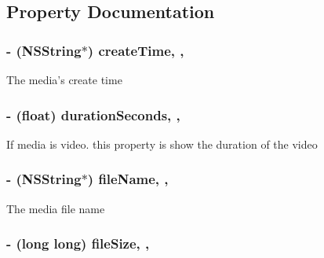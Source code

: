 \subsection{Property Documentation}
\hypertarget{interface_d_j_i_media_a5fca68c2fabc5e5f2b10ca028ad68954}{
\subsubsection[{create\+Time}]{\setlength{\rightskip}{0pt plus 5cm}-\/ (N\+S\+String$\ast$) create\+Time\hspace{0.3cm}{\ttfamily [read]}, {\ttfamily [nonatomic]}, {\ttfamily [assign]}}}\label{interface_d_j_i_media_a5fca68c2fabc5e5f2b10ca028ad68954}
The media's create time \hypertarget{interface_d_j_i_media_a530c5cebcd1ffa67e1b32e73946f3961}{
\subsubsection[{duration\+Seconds}]{\setlength{\rightskip}{0pt plus 5cm}-\/ (float) duration\+Seconds\hspace{0.3cm}{\ttfamily [read]}, {\ttfamily [nonatomic]}, {\ttfamily [assign]}}}\label{interface_d_j_i_media_a530c5cebcd1ffa67e1b32e73946f3961}
If media is video. this property is show the duration of the video \hypertarget{interface_d_j_i_media_ad57506b4b8d11c702f55ce934b243fd4}{
\subsubsection[{file\+Name}]{\setlength{\rightskip}{0pt plus 5cm}-\/ (N\+S\+String$\ast$) file\+Name\hspace{0.3cm}{\ttfamily [read]}, {\ttfamily [nonatomic]}, {\ttfamily [assign]}}}\label{interface_d_j_i_media_ad57506b4b8d11c702f55ce934b243fd4}
The media file name \hypertarget{interface_d_j_i_media_aad9cace96d93c6d5cb0a09cc88683ce7}{
\subsubsection[{file\+Size}]{\setlength{\rightskip}{0pt plus 5cm}-\/ (long long) file\+Size\hspace{0.3cm}{\ttfamily [read]}, {\ttfamily [nonatomic]}, {\ttfamily [assign]}}}\label{interface_d_j_i_media_aad9cace96d93c6d5cb0a09cc88683ce7}
